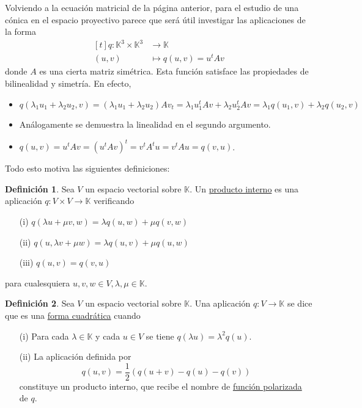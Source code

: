 \documentclass[12pt]{report}
\theoremstyle{definition}
\newtheorem{definition}{Definición}[chapter]
\theoremstyle{definition}
\theoremstyle{remark}
\begin{document}
Volviendo a la ecuación matricial de la página anterior, para el estudio de una cónica en el espacio proyectivo parece que será útil investigar las aplicaciones de la forma
\[
\begin{aligned}[t]
q \colon \mathbb{K}^3 \times \mathbb{K}^3 &\longrightarrow \mathbb{K} \\
(u,v) &\longmapsto q(u,v) = u^tAv
\end{aligned}
\]
donde $A$ es una cierta matriz simétrica. Esta función satisface las propiedades de bilinealidad y simetría. En efecto,
\begin{itemize}
    \item $q(\lambda_1 u_1+\lambda_2 u_2, v) = (\lambda_1 u_1+\lambda_2 u_2)Av_t = \lambda_1 u_1^t A v+\lambda_2u_2^tAv=\lambda_1 q(u_1,v)+\lambda_2 q(u_2,v)$
    \item Análogamente se demuestra la linealidad en el segundo argumento.
    \item $q(u,v) = u^tAv = (u^tAv)^t = v^tA^tu = v^tAu = q(v,u)$.
\end{itemize}
Todo esto motiva las siguientes definiciones:

\begin{definition}
Sea $V$ un espacio vectorial sobre $\mathbb{K}$. Un \ul{producto interno} es una aplicación $q \colon V \times V \to \mathbb{K}$ verificando
\begin{itemize}
    \item[(i)] $q(\lambda u+\mu v, w) = \lambda q(u,w)+\mu q(v,w)$
    \item[(ii)] $q(u, \lambda v + \mu w) = \lambda q(u,v)+\mu q(u,w)$
    \item[(iii)] $q(u,v) = q(v,u)$
\end{itemize}
para cualesquiera $u,v,w \in V, \lambda, \mu \in \mathbb{K}$.
\end{definition}

\begin{definition}
\label{def4.4.}
Sea $V$ un espacio vectorial sobre $\mathbb{K}$. Una aplicación $q \colon V \to \mathbb{K}$ se dice que es una \ul{forma cuadrática} cuando
\begin{itemize}
    \item[(i)] Para cada $\lambda \in \mathbb{K}$ y cada $u \in V$ se tiene $q(\lambda u) = \lambda^2 q(u)$.
    \item[(ii)] La aplicación definida por
    \[q(u,v) = \frac{1}{2}(q(u+v)-q(u)-q(v))\]
    constituye un producto interno, que recibe el nombre de \ul{función polarizada} de $q$.
\end{itemize}
\end{definition}
\end{document}
